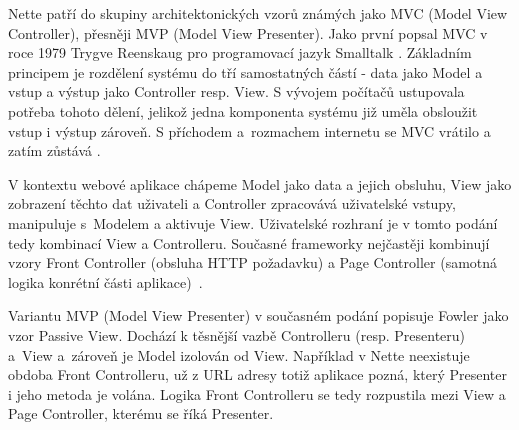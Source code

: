 Nette patří do skupiny architektonických vzorů známých jako MVC (Model View Controller), přesněji MVP (Model View Presenter). Jako první popsal MVC v roce 1979 Trygve Reenskaug pro programovací jazyk Smalltalk \cite{FowlerMVC}. Základním principem je rozdělení systému do tří samostatných částí - data jako Model a vstup a výstup jako Controller resp. View. S vývojem počítačů ustupovala potřeba tohoto dělení, jelikož jedna komponenta systému již uměla obsloužit vstup i výstup zároveň. S příchodem a~rozmachem internetu se MVC vrátilo a zatím zůstává \cite{zdrojakMVC}.

V kontextu webové aplikace chápeme Model jako data a jejich obsluhu, View jako zobrazení těchto dat uživateli a Controller zpracovává uživatelské vstupy, manipuluje s~Modelem a aktivuje View. Uživatelské rozhraní je v tomto podání tedy kombinací View a Controlleru. Současné frameworky nejčastěji kombinují vzory Front Controller (obsluha HTTP požadavku) a Page Controller (samotná logika konrétní části aplikace)~\cite{FowlerMVC}.

Variantu MVP (Model View Presenter) v současném podání popisuje Fowler\cite{FowlerPassiveView} jako vzor Passive View. Dochází k těsnější vazbě Controlleru (resp. Presenteru) a~View a~zároveň je Model izolován od View. Například v Nette neexistuje obdoba Front Controlleru, už z URL adresy totiž aplikace pozná, který Presenter i jeho metoda je volána. Logika Front Controlleru se tedy rozpustila mezi View a Page Controller, kterému se říká Presenter.
